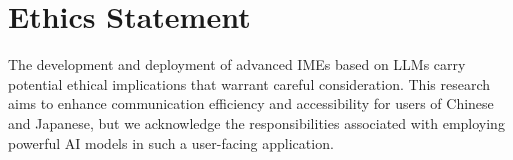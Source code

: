 \documentclass[10pt, a4paper]{article}
\begin{document}





\section{Ethics Statement}

The development and deployment of advanced IMEs based on LLMs carry potential ethical implications that warrant careful consideration. This research aims to enhance communication efficiency and accessibility for users of Chinese and Japanese, but we acknowledge the responsibilities associated with employing powerful AI models in such a user-facing application.
\end{document}
